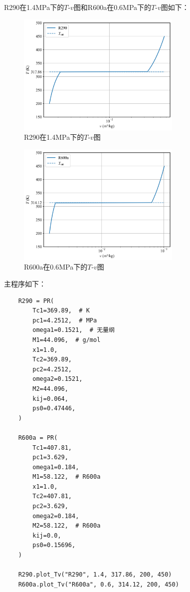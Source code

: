 \documentclass[12pt,a4paper]{article}
\begin{document}
R290在1.4MPa下的$T$-$v$图和R600a在0.6MPa下的$T$-$v$图如下：
\begin{figure}[H]
    \centering
    \includegraphics[width=0.7\textwidth]{R290.png}
    \caption{R290在1.4MPa下的$T$-$v$图}
\end{figure}

\begin{figure}[H]
    \centering
    \includegraphics[width=0.7\textwidth]{R600a.png}
    \caption{R600a在0.6MPa下的$T$-$v$图}
\end{figure}

主程序如下：

\begin{lstlisting}
    R290 = PR(
        Tc1=369.89,  # K
        pc1=4.2512,  # MPa
        omega1=0.1521,  # 无量纲
        M1=44.096,  # g/mol
        x1=1.0,
        Tc2=369.89,
        pc2=4.2512,
        omega2=0.1521,
        M2=44.096,
        kij=0.064,
        ps0=0.47446,
    )

    R600a = PR(
        Tc1=407.81,
        pc1=3.629,
        omega1=0.184,
        M1=58.122,  # R600a
        x1=1.0,
        Tc2=407.81,
        pc2=3.629,
        omega2=0.184,
        M2=58.122,  # R600a
        kij=0.0,
        ps0=0.15696,
    )

    R290.plot_Tv("R290", 1.4, 317.86, 200, 450)
    R600a.plot_Tv("R600a", 0.6, 314.12, 200, 450)
\end{lstlisting}
\end{document}
